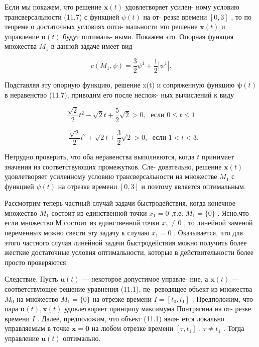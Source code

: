 \documentclass[8pt]{extarticle}
\begin{document}
Если мы покажем, что решение \(\mathbf{x}\left( t\right)\) удовлетворяет усилен- ному условию трансверсальности (11.7) с функцией \(\psi \left( t\right)\) на от- резке времени \(\left[ 0,3 \right]\) , то по теореме о достаточных условиях опти- мальности это решение \(\mathbf{x}\left( t\right)\) и управление \(\mathbf{u}\left( t\right)\) будут оптималь- ными. Покажем это. Опорная функция множества \({M}_{1}\) в данной задаче имеет вид

\[
c\left( {{M}_{1},\psi }\right)  = \frac{3}{2}{\psi }^{1} + \frac{1}{2}\left| {\psi }^{1}\right| .
\]

Подставляя эту опорную функцию, решение x(t) и сопряженную функцию \(\mathbf{\psi }\left( t\right)\) в неравенство (11.7), приводим его после неслож- ных вычислений к виду

\[
\frac{\sqrt{2}}{2}{t}^{2} - \sqrt{2}t + \frac{5}{2}\sqrt{2} > 0,\;\text{ если }0 \leq  t \leq  1
\]

\[
- \frac{\sqrt{2}}{2}{t}^{2} + \sqrt{2}t + \frac{3}{2}\sqrt{2} > 0,\;\text{ если }1 < t < 3.
\]

Нетрудно проверить, что оба неравенства выполняются, когда \(t\) принимает значения из соответствующих промежутков. Сле- довательно, решение \(\mathbf{x}\left( t\right)\) удовлетворяет усиленному условию трансверсальности на множестве \({M}_{1}\) с функцией \(\psi \left( t\right)\) на отрезке времени \(\left[ 0,3 \right]\) и поэтому является оптимальным.

Рассмотрим теперь частный случай задачи быстродействия, когда конечное множество \({M}_{1}\) состоит из единственной точки \({x}_{1} = 0\) ,т.е. \({M}_{1} = \{ 0\}\) . Ясно,что если множество М состоит из единственной точки \({x}_{1} \neq  0\) , то линейной заменой переменных можно свести эту задачу к случаю \({x}_{1} = 0\) . Оказывается, что для этого частного случая линейной задачи быстродействия можно получить более жесткие достаточные условия оптимальности, которые в действительности более просто проверяются.

Следствие. Пусть \(\mathbf{u}\left( t\right)\) — некоторое допустимое управле- ние, а \(\mathbf{x}\left( t\right)\) — соответствующее решение уравнения (11.1), пе- реводящее объект из множества \({M}_{0}\) на множество \({M}_{1} = \{ 0\}\) на отрезке времени \(I = \left\lbrack  {{t}_{0},{t}_{1}}\right\rbrack\) . Предположим, что пара \(\mathbf{u}\left( t\right) ,\mathbf{x}\left( t\right)\) удовлетворяет принципу максимума Понтрягина на от- резке времени \(I\) . Далее, предположим, что объект (11.1) явля- ется локально управляемым в точке \(\mathbf{x} = \mathbf{0}\) на любом отрезке времени \(\left\lbrack  {\tau ,{t}_{1}}\right\rbrack\) , \(\tau  \neq  {t}_{1}\) . Тогда управление \(\mathbf{u}\left( t\right)\) оптимально.
\end{document}
